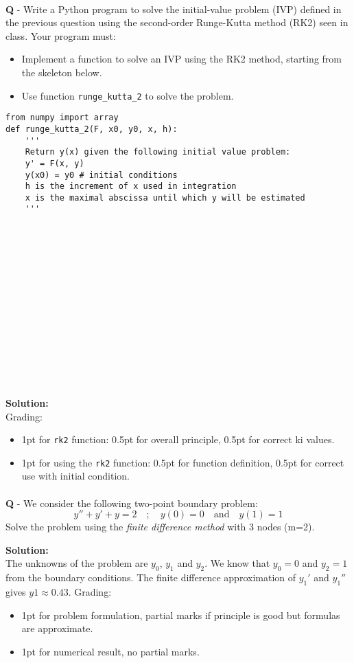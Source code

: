 \documentclass{llncs}
\newcounter{ques}
\renewcommand{\question}[1]{\paragraph{}\textbf{Q\theques} - #1\stepcounter{ques} }
\newcommand{\answer}[1]{\color{red}\textbf{Solution:}\\#1\color{black}}
\begin{document}
\question{Write a Python program to solve the initial-value problem 
(IVP) defined in the previous question using the second-order 
Runge-Kutta method (RK2) seen in class. Your program must:
\begin{itemize}
\item Implement a function to solve an IVP using the RK2 method, starting from the skeleton below.
\item Use function \texttt{runge\_kutta\_2} to solve the problem.
\end{itemize}
}
\begin{verbatim}
from numpy import array
def runge_kutta_2(F, x0, y0, x, h):
    ''' 
    Return y(x) given the following initial value problem:
    y' = F(x, y)
    y(x0) = y0 # initial conditions
    h is the increment of x used in integration
    x is the maximal abscissa until which y will be estimated
    '''
















\end{verbatim}


\answer{
\color{red} Grading:
\begin{itemize}
\item 1pt for \texttt{rk2} function: 0.5pt for overall principle, 0.5pt for correct ki values.
\item 1pt for using the \texttt{rk2} function: 0.5pt for function definition, 0.5pt for correct use with initial condition.
\end{itemize}
}
\newpage

\question{We consider the following two-point boundary problem:
$$
y''+y'+y=2 \quad ; \quad y(0)=0  \quad \mathrm{and} \quad y(1)=1
$$
Solve the problem using the \emph{finite difference method} with 3 nodes (m=2). 
}

\answer{The unknowns of the problem are $y_0$, $y_1$ and $y_2$. We know that $y_0=0$ and $y_2=1$ from the boundary conditions. The finite difference approximation
of $y_1'$ and $y_1''$ gives $y1 \approx 0.43$.
Grading:
\begin{itemize}
\item 1pt for problem formulation, partial marks if principle is good but formulas are approximate.
\item 1pt for numerical result, no partial marks.
\end{itemize}
}
\end{document}
